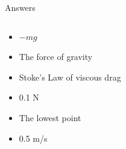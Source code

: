 \documentclass{beamer}
\begin{document}
\begin{frame}{Answers}
\begin{columns}[T]
\begin{column}{0.5\textwidth}
\begin{itemize}
\item $-mg$
\item The force of gravity
\item Stoke's Law of viscous drag
\item 0.1 N
\item The lowest point
\item 0.5 m/s
\end{itemize}
\end{column}
\begin{column}{0.5\textwidth}

\end{column}
\end{columns}
\end{frame}
\end{document}
